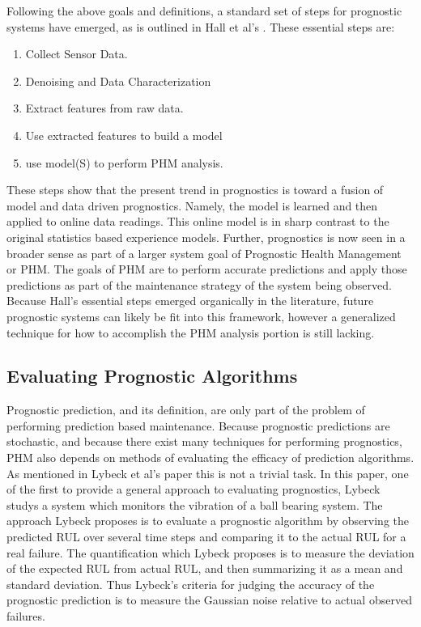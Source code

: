 \documentclass[12pt]{article}
\begin{document}
Following the above goals and definitions, a standard set of steps for
prognostic systems have emerged, as is outlined in Hall et al's
\cite{6024332}.  These essential steps are:
\begin{enumerate}
  \item Collect Sensor Data.
  \item Denoising and Data Characterization
  \item Extract features from raw data.
  \item Use extracted features to build a model
  \item use model(S) to perform PHM analysis.
\end{enumerate}
These steps show that the present trend in prognostics is toward a
fusion of model and data driven prognostics.  Namely, the model is
learned and then applied to online data readings.  This online model
is in sharp contrast to the original statistics based experience
models.  Further, prognostics is now seen in a broader sense as part
of a larger system goal of Prognostic Health Management or PHM.  The
goals of PHM are to perform accurate predictions and apply those
predictions as part of the maintenance strategy of the system being
observed.  Because Hall's essential steps emerged organically in the
literature, future prognostic systems can likely be fit into this
framework, however a generalized technique for how to accomplish the
PHM analysis portion is still lacking.

\subsection{Evaluating Prognostic Algorithms}
Prognostic prediction, and its definition, are only part of the
problem of performing prediction based maintenance.  Because
prognostic predictions are stochastic, and because there exist many
techniques for performing prognostics, PHM also depends on methods of
evaluating the efficacy of prediction algorithms.  As mentioned in
Lybeck et al's paper \cite{4161637} this is not a trivial task.  In
this paper, one of the first to provide a general approach to
evaluating prognostics, Lybeck studys a system which monitors the
vibration of a ball bearing system.  The approach Lybeck proposes is
to evaluate a prognostic algorithm by observing the predicted RUL over
several time steps and comparing it to the actual RUL for a real
failure.  The quantification which Lybeck proposes is to measure the
deviation of the expected RUL from actual RUL, and then summarizing it
as a mean and standard deviation.  Thus Lybeck's criteria for judging
the accuracy of the prognostic prediction is to measure the Gaussian
noise relative to actual observed failures.
\end{document}
